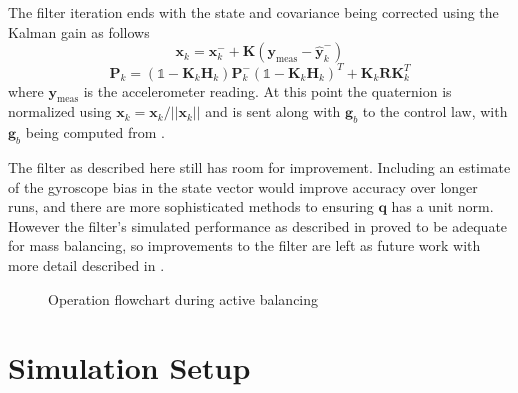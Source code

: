 The filter iteration ends with the state and covariance being corrected using the Kalman gain as follows
\begin{equation}
    \bm{x}_k = \bm{x}_k^- + \bm{K}(\bm{y}_{\text{meas}}-\hat{\bm{y}}_k^-)
\end{equation}
\begin{equation}
    \bm{P}_k = (\mathbb{1} - \bm{K}_k\bm{H}_k)\bm{P}_k^-(\mathbb{1} - \bm{K}_k\bm{H}_k)^T
    + \bm{K}_k\bm{R}\bm{K}_k^T
\end{equation}
where $\bm{y}_{\text{meas}}$ is the accelerometer reading. At this point the quaternion is normalized using $\bm{x}_k = \bm{x}_k / ||\bm{x}_k||$ and is sent along with $\bm{g}_b$ to the control law, with $\bm{g}_b$ being computed from .

The filter as described here still has room for improvement. Including an estimate of the gyroscope bias in the state vector would improve accuracy over longer runs, and there are more sophisticated methods to ensuring $\bm{q}$ has a unit norm. However the filter's simulated performance as described in  proved to be adequate for mass balancing, so improvements to the filter are left as future work with more detail described in .

\begin{figure}
    \centering
    
    \caption{Operation flowchart during active balancing}
    \label{fig:sys_arch_active}
\end{figure}



\section{Simulation Setup}\label{sec:sim_setup}